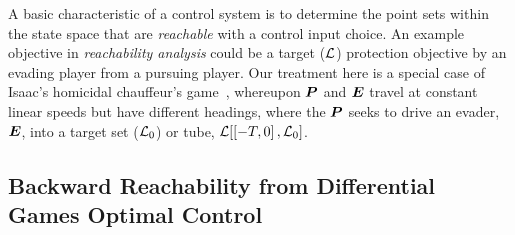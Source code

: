 \noindent A basic characteristic of a control system is to determine the  point sets within the state space that are \textit{reachable} with a control input choice. An example objective in \textit{reachability analysis} could be a target ($\mathcal{L}$) protection objective by an evading player from a pursuing player. Our treatment here is a special case of Isaac's homicidal chauffeur's game~\cite{Isaacs1965}, whereupon $\bm{P}$ and $\bm{E}$ travel at constant linear speeds but have different headings, \eg where the $\bm{P}$ seeks to drive an evader, $\bm{E}$, into a target  set ($\mathcal{L}_0$) or tube, $\mathcal{L}[\left[-T, 0\right], \mathcal{L}_0]$. %


\subsection{Backward Reachability from Differential Games Optimal Control}

